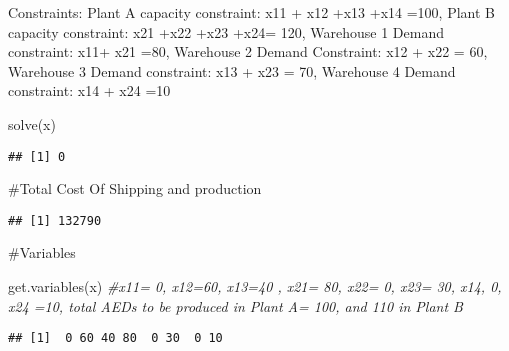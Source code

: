 \documentclass[
]{article}
\newenvironment{Shaded}{\begin{snugshade}}{\end{snugshade}}
\newcommand{\CommentTok}[1]{\textcolor[rgb]{0.56,0.35,0.01}{\textit{#1}}}
\newcommand{\FunctionTok}[1]{\textcolor[rgb]{0.00,0.00,0.00}{#1}}
\newcommand{\NormalTok}[1]{#1}
\begin{document}
Constraints: Plant A capacity constraint: x11 + x12 +x13 +x14 =100,
Plant B capacity constraint: x21 +x22 +x23 +x24= 120, Warehouse 1 Demand
constraint: x11+ x21 =80, Warehouse 2 Demand Constraint: x12 + x22 = 60,
Warehouse 3 Demand constraint: x13 + x23 = 70, Warehouse 4 Demand
constraint: x14 + x24 =10

\begin{Shaded}
\begin{Highlighting}[]
\FunctionTok{solve}\NormalTok{(x)}
\end{Highlighting}
\end{Shaded}

\begin{verbatim}
## [1] 0
\end{verbatim}

\#Total Cost Of Shipping and production

\begin{Shaded}
\end{Shaded}

\begin{verbatim}
## [1] 132790
\end{verbatim}

\#Variables

\begin{Shaded}
\begin{Highlighting}[]
\FunctionTok{get.variables}\NormalTok{(x)   }\CommentTok{\#x11= 0, x12=60, x13=40 , x21= 80, x22= 0, x23= 30, x14, 0, x24 =10, total AEDs to be produced in Plant A= 100, and 110 in Plant B}
\end{Highlighting}
\end{Shaded}

\begin{verbatim}
## [1]  0 60 40 80  0 30  0 10
\end{verbatim}
\end{document}
